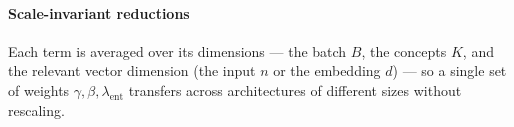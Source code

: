 
    \paragraph{Scale-invariant reductions} Each term is averaged over its
    dimensions --- the batch $B$, the concepts $K$, and the relevant vector
    dimension (the input $n$ or the embedding $d$) --- so a single set of
    weights $\gamma, \beta, \lambda_{\mathrm{ent}}$ transfers across
    architectures of different sizes without rescaling.

